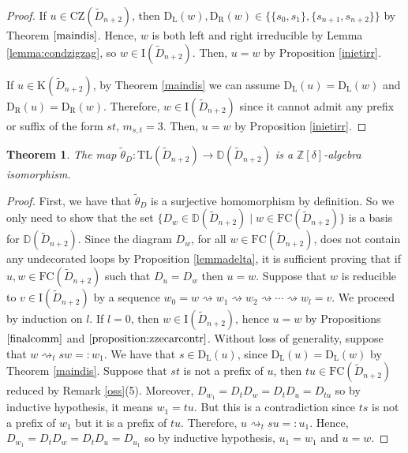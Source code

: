 \documentclass{amsart}
\newcommand{\Z}{{\mathbb Z}}
\newcommand{\D}{{\widetilde{D}_{n+2}}}
\newcommand{\Di}{{\mathbb D}}
\newcommand{\ld}{{\mathrm{D}_{\mathrm{L}}}}
\newcommand{\rd}{{\mathrm{D}_{\mathrm{R}}}}
\newcommand{\tl}{{\mathrm{TL}}}
\newcommand{\fc}{{\mathrm{FC}}}
\newcommand{\zz}{\mathrm{CZ}}
\newcommand{\car}{\mathrm{K}}
\newcommand{\I}{\mathrm{I}}
\newcommand{\red}{\rightsquigarrow}
\newtheorem{Theorem}{Theorem}[section]
\theoremstyle{definition}
\begin{document}
\begin{proof}
If $u\in \zz(\D)$, then $\ld(w),\rd(w)\in \{\{s_0,s_1\},\{s_{n+1},s_{n+2}\}\}$ by Theorem $\ref{maindis}$. Hence, $w$ is both left and right irreducible by Lemma \ref{lemma:condzigzag}, so $w\in \I(\D)$. Then, $u=w$ by Proposition \ref{inietirr}. 

If $u\in \car(\D)$, by Theorem \ref{maindis} we can assume $\ld(u)=\ld(w)$ and $\rd(u)=\rd(w)$. Therefore, $w\in \I(\D)$ since it cannot admit any prefix or suffix of the form $st$, $m_{s,t}=3$. Then, $u=w$ by Proposition \ref{inietirr}.
\end{proof}





\begin{Theorem}
\label{lastresult}
The map $\widetilde{\theta}_D:\tl(\D) \rightarrow \Di(\D)$ is a $\Z[\delta]$-algebra isomorphism.
\end{Theorem}

\begin{proof}
First, we have that $\widetilde{\theta}_D$ is a surjective homomorphism by definition. So we only need to show that the set $\{D_w\in \Di(\D)\mid w\in \fc(\D)\}$ is a basis for $\Di(\D)$. Since the diagram $D_w$, for all $w\in \fc(\D)$, does not contain any undecorated loops by Proposition \ref{lemmadelta}, it is sufficient proving that if $u,w \in \fc(\D)$ such that $D_u=D_w$ then $u=w$. Suppose that $w$ is reducible to $v\in\I(\D)$ by a sequence $w_0=w\red w_1\red w_2\red \cdots \red w_l=v$.
We proceed by induction on $l$. If $l=0$, then $w\in \I(\D)$, hence $u=w$ by Propositions $\ref{finalcomm}$ and $\ref{proposition:zzecarcontr}$. Without loss of generality, suppose that $w\red_t sw=:w_1$. We have that $s\in \ld(u)$, since $\ld(u)=\ld(w)$ by Theorem \ref{maindis}. Suppose that $st$ is not a prefix of $u$, then $tu\in \fc(\D)$ reduced by Remark \ref{oss}(5). Moreover, $D_{w_1}=D_tD_w=D_{t}D_u=D_{tu}$ so by inductive hypothesis, it means $w_1=tu$. But this is a contradiction since $ts$ is not a prefix of $w_1$ but it is a prefix of $tu$. Therefore, $u\red_t su=:u_1$. Hence, $D_{w_1}=D_tD_w=D_tD_u=D_{u_1}$ so by inductive hypothesis, $u_1=w_1$ and $u=w$.  
\end{proof}
\end{document}
